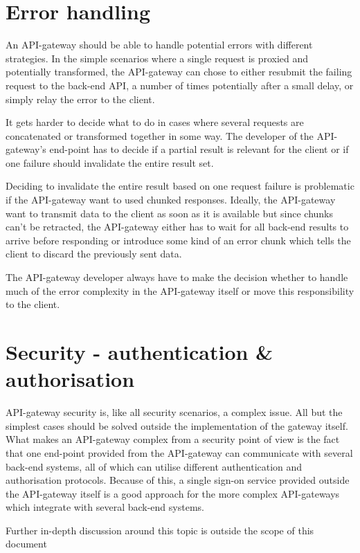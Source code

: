 \documentclass{cslthse-msc}
\begin{document}
\section{Error handling}
An API-gateway should be able to handle potential errors with different strategies. In the simple scenarios where a single request is proxied and potentially transformed, the API-gateway can chose to either resubmit the failing request to the back-end API, a number of times potentially after a small delay, or simply relay the error to the client.

It gets harder to decide what to do in cases where several requests are concatenated or transformed together in some way. The developer of the API-gateway's end-point has to decide if a partial result is relevant for the client or if one failure should invalidate the entire result set.

Deciding to invalidate the entire result based on one request failure is problematic if the API-gateway want to used chunked responses. Ideally, the API-gateway want to transmit data to the client as soon as it is available but since chunks can't be retracted, the API-gateway either has to wait for all back-end results to arrive before responding or introduce some kind of an error chunk which tells the client to discard the previously sent data.

The API-gateway developer always have to make the decision whether to handle much of the error complexity in the API-gateway itself or move this responsibility to the client.

\section{Security - authentication \& authorisation}
\label{sec:security}
API-gateway security is, like all security scenarios, a complex issue. All but the simplest cases should be solved outside the implementation of the gateway itself. What makes an API-gateway complex from a security point of view is the fact that one end-point provided from the API-gateway can communicate with several back-end systems, all of which can utilise different authentication and authorisation protocols. Because of this, a single sign-on service provided outside the API-gateway itself is a good approach for the more complex API-gateways which integrate with several back-end systems.

Further in-depth discussion around this topic is outside the scope of this document
\end{document}
